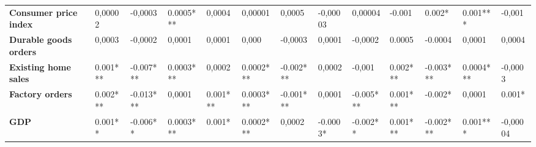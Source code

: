\begin{landscape}
\begin{table}[]
{\begin{tabular}{@{}lllllllllllll@{}}
\textbf{Consumer price index}     & 0,00002                               & -0,0003                               & 0.0005***                             & 0,0004                                & 0,00001                               & 0,0005                                & -0,00003                              & 0,00004                               & -0.001                                & 0.002*                                & 0.001***                              & -0,001                                \\
\textbf{Durable goods orders}     & 0,0003                                & -0,0002                               & 0,0001                                & 0,0001                                & 0,000                                 & -0,0003                               & 0,0001                                & -0,0002                               & 0.0005                                & -0.0004                               & 0,0001                                & 0,0004                                \\
\textbf{Existing home sales}      & 0.001***                              & -0.007***                             & 0.0003***                             & 0,0002                                & 0.0002***                             & -0.002***                             & 0,0002                                & -0,001                                & 0.002***                              & -0.003***                             & 0.0004***                             & -0,0003                               \\
\textbf{Factory orders}           & 0.002***                              & -0.013***                             & 0,0001                                & 0.001***                              & 0.0003***                             & -0.001***                             & 0,0001                                & -0.005***                             & 0.001***                              & -0.002*                               & 0,0001                                & 0.001*                                \\
\textbf{GDP}                      & 0.001**                               & -0.006**                              & 0.0003***                             & 0.001*                                & 0.0002***                             & 0,0002                                & -0.0003*                              & -0.002**                              & 0.001***                              & -0.002***                             & 0.001***                              & -0,00004                              \\

\end{tabular}}
\end{table}
\end{landscape}

